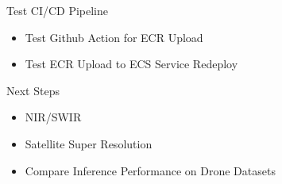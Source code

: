 \begin{frame}{Test CI/CD Pipeline}
    \begin{itemize}
        \item Test Github Action for ECR Upload
        \item Test ECR Upload to ECS Service Redeploy
    \end{itemize}  
\end{frame}

\begin{frame}{Next Steps}
    \begin{itemize}
        \item NIR/SWIR
        \item Satellite Super Resolution
        \item Compare Inference Performance on Drone Datasets
    \end{itemize}  
\end{frame}






